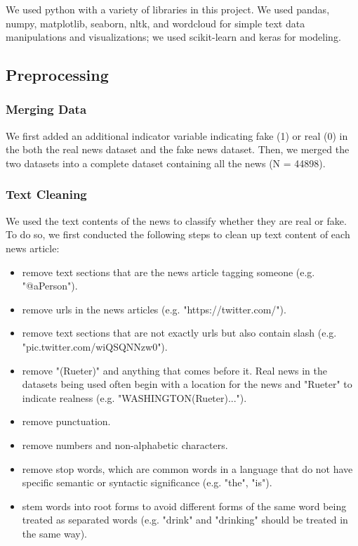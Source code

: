 \documentclass{article}
\begin{document}
\begin{multicols}{2}
We used python with a variety of libraries in this project. We used pandas, numpy, matplotlib, seaborn, nltk, and wordcloud for simple text data manipulations and visualizations; we used scikit-learn and keras for modeling.

\subsection{Preprocessing}

\subsubsection{Merging Data}
We first added an additional indicator variable indicating fake (1) or real (0) in the both the real news dataset and the fake news dataset. Then, we merged the two datasets into a complete dataset containing all the news (N = 44898). 

\subsubsection{Text Cleaning}
We used the text contents of the news to classify whether they are real or fake. To do so, we first conducted the following steps to clean up text content of each news article:


\begin{itemize}[noitemsep]
  \item remove text sections that are the news article tagging someone (e.g. "@aPerson").
  \item remove urls in the news articles (e.g. "https://twitter.com/").
  \item remove text sections that are not exactly urls but also contain slash (e.g. "pic.twitter.com/wiQSQNNzw0").
  \item remove "(Rueter)" and anything that comes before it. Real news in the datasets being used often begin with a location for the news and "Rueter" to indicate realness (e.g. "WASHINGTON(Rueter)...").
  \item remove punctuation.
  \item remove numbers and non-alphabetic characters.
  \item remove stop words, which are common words in a language that do not have specific semantic or syntactic significance (e.g. "the", "is").
  \item stem words into root forms to avoid different forms of the same word being treated as separated words (e.g. "drink" and "drinking" should be treated in the same way).
\end{itemize}


\end{multicols}
\end{document}

